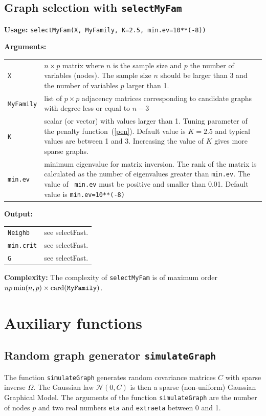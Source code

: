 \documentclass[noinfoline]{imsart}
\begin{document}
\newpage
\subsection{Graph selection with \mbox{{\tt selectMyFam}}}
{\bf Usage:} {\tt selectMyFam(X, MyFamily, K=2.5, min.ev=10**(-8))}
\medskip

{\bf Arguments:}\smallskip

 \begin{tabular}{lp{13cm}}
 {\tt X} & $n\times p$ matrix where $n$ is the sample size and $p$ the number of variables (nodes). The sample size $n$ should be larger than 3 and the number of variables $p$ larger than 1.\\
{\tt MyFamily}	& list of $p\times p$ adjacency matrices corresponding to candidate graphs with degree less or equal to $n-3$\\
{\tt K} & scalar (or vector) with values larger than 1. Tuning parameter of the penalty function~(\ref{pen}). Default value is $K=2.5$ and typical values are between 1 and 3. Increasing the value of $K$ gives more sparse graphs. \\
{\tt min.ev} &	 minimum eigenvalue for matrix inversion.  The rank of the matrix is calculated as the
  number of eigenvalues greater than {\tt min.ev}. The value of {\tt
    min.ev} must be positive and smaller than 0.01. Default value is {\tt min.ev=10**(-8)}
   \end{tabular}
\medskip

{\bf Output:}\smallskip

 \begin{tabular}{lp{13cm}}
 {\tt Neighb}& see selectFast.\\
 {\tt min.crit}& see selectFast.\\
 {\tt G}& see selectFast.
 \end{tabular}
\medskip

{\bf Complexity:}
The complexity of \mbox{{\tt selectMyFam}} is of maximum order $np\min(n,p)\times\textrm{card}({\tt MyFamily})$.











\section{Auxiliary functions}
\subsection{Random graph generator {\tt simulateGraph}}
The function {\tt simulateGraph} generates random covariance matrices $C$ with sparse inverse $\Omega$. The Gaussian law $\mathcal{N}(0,C)$ is then a sparse (non-uniform) Gaussian Graphical Model. The arguments of the function \mbox{{\tt simulateGraph}} are the number of nodes $p$ and two real numbers {\tt eta} and {\tt extraeta} between 0 and 1.\smallskip
\end{document}
